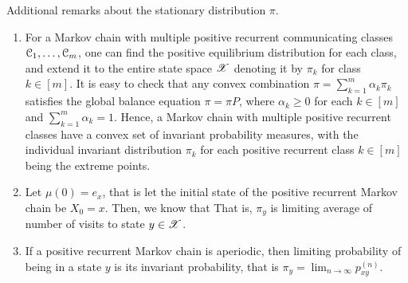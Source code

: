 \documentclass[letterpaper,10pt,english]{article}
\begin{document}
\begin{shaded*}
\begin{rem} 
Additional remarks about the stationary distribution $\pi$. 
\begin{enumerate}[i\_]
\item For a Markov chain with multiple positive recurrent communicating classes $\mathcal{C}_1, \dots, \mathcal{C}_m$, 
one can find the positive equilibrium distribution for each class, 
and extend it to the entire state space $\mathscr{X}$ denoting it by $\pi_k$ for class $k \in [m]$.  
It is easy to check that any convex combination $\pi = \sum_{k = 1}^m\alpha_k\pi_k$ satisfies the global balance equation $\pi = \pi P$, 
where $\alpha_k \ge 0$ for each $k \in [m]$ and $\sum_{k=1}^m\alpha_k = 1$. 
Hence, a Markov chain with multiple positive recurrent classes have a convex set of invariant probability measures, 
with the individual invariant distribution $\pi_k$ for each positive recurrent class $k \in [m]$ being the extreme points. 

\item Let $\mu(0) = e_x$, that is let the initial state of the positive recurrent Markov chain be $X_0 = x$. 
Then, we know that %
That is, $\pi_y$ is limiting average of number of visits to state $y \in \mathscr{X}$. 
\item If a positive recurrent Markov chain is aperiodic, then limiting probability of being in a state $y$ is its invariant probability, 
that is $\pi_y = \lim_{n \to \infty}p_{xy}^{(n)}$. 
\end{enumerate}
\end{rem}
\end{shaded*}
\end{document}
